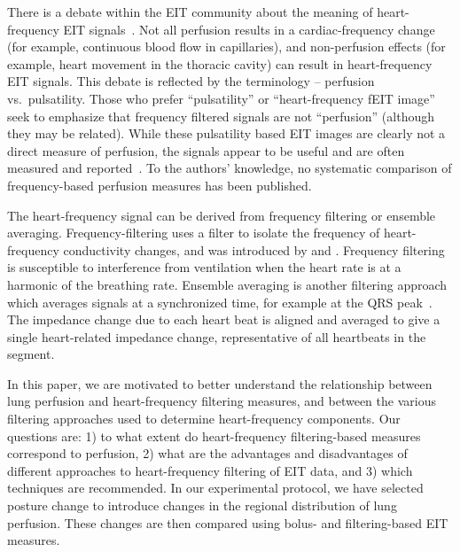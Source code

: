 There is a debate within the EIT community about the meaning of
heart-frequency EIT signals~\parencite{frerichs_chest_2017,adler_electrical_2017}. 
Not all perfusion results in a
cardiac-frequency change (for example, continuous blood flow in capillaries),
and
non-perfusion effects (for example, heart movement in the thoracic cavity)
can result in heart-frequency EIT signals.
This debate is reflected by the terminology 
-- perfusion vs.\ pulsatility.
Those who prefer ``pulsatility'' or ``heart-frequency fEIT image'' seek to emphasize that frequency
filtered signals are not ``perfusion'' (although they may be related).
While these pulsatility based EIT images are clearly not a direct measure of
perfusion, the signals appear to be useful and are often measured and 
reported~\parencite{bartocci_cerebral_1999,halter_imaging_2008,moens_variety_2014,ericsson_effect_2016}. 
To the authors' knowledge, no systematic comparison of
frequency-based perfusion measures has been published.

The heart-frequency signal can be derived from
frequency filtering or ensemble averaging.
Frequency-filtering uses a filter to isolate the frequency of heart-frequency conductivity changes,
and was introduced by  and . 
Frequency filtering is susceptible
to interference from ventilation when the heart rate is at a harmonic
of the breathing rate.
Ensemble averaging is another filtering approach which
averages signals at a synchronized time, for example at the QRS 
peak~\parencite{bartocci_cerebral_1999,deibele_dynamic_2008}. The impedance change due to each heart 
beat is aligned and averaged to give a single heart-related impedance change,
representative of all heartbeats in the segment.

In this paper, we are motivated to better understand the relationship between
lung perfusion and heart-frequency filtering measures, and between the various filtering
approaches used to determine heart-frequency components. Our questions are:
1) to what extent do heart-frequency filtering-based measures correspond to perfusion,
2) what are the advantages and disadvantages of different approaches
to heart-frequency filtering of EIT data, and 3) which techniques are recommended.
In our experimental protocol, we have selected posture change 
to introduce changes in the regional distribution of lung perfusion.
These changes are then compared using bolus- and filtering-based
EIT measures.



